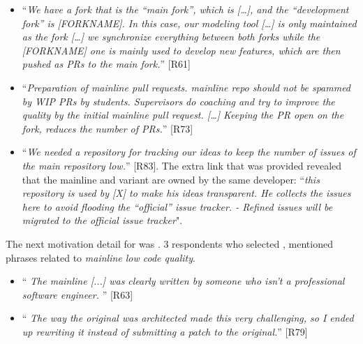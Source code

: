 \begin{itemize}[leftmargin=*]
\item ``\emph{We have a fork that is the ``main fork'', which is [\ldots], %
and the ``development fork'' is [FORKNAME]. %
In this case, our modeling tool [\ldots] is only maintained as the fork [\ldots] we synchronize everything between both forks while the [FORKNAME] one is mainly used to develop new features, which are then pushed as PRs to the main fork.}'' [R61]

\item ``\emph{Preparation of mainline pull requests. mainline repo should not be spammed by WIP PRs by students. Supervisors do coaching and try to improve the quality by the initial mainline pull request. [\dots] Keeping the PR open on the fork, reduces the number of PRs.}'' [R73]

\item ``\emph{We needed a repository for tracking our ideas to keep the number of issues of the main repository low.}'' [R83]. The extra link that was provided revealed that the mainline and variant are owned by the same developer: ``\emph{this repository is used by [X] to make his ideas transparent. He collects the issues here to avoid flooding the ``official'' issue tracker. - Refined issues will be migrated to the official issue tracker}".
\end{itemize}

\nd The next motivation detail for   was .
3 respondents who selected , mentioned phrases related to \emph{mainline low code quality}.

\begin{itemize}[leftmargin=*]
\item ``\emph{%
The mainline [...] %
was clearly written by someone who isn't a professional software engineer.%
}'' [R63]

\item ``\emph{%
The way the original was architected made this very challenging, so I ended up rewriting it instead of submitting a patch to the original.}'' [R79]
\end{itemize}


